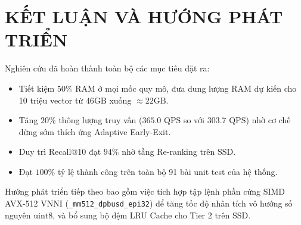 \documentclass[12pt,a4paper]{article}
\begin{document}
\section{KẾT LUẬN VÀ HƯỚNG PHÁT TRIỂN}
Nghiên cứu đã hoàn thành toàn bộ các mục tiêu đặt ra:
\begin{itemize}
  \item Tiết kiệm $50\%$ RAM ở mọi mốc quy mô, đưa dung lượng RAM dự kiến cho 10 triệu vector từ $46\text{GB}$ xuống $\approx 22\text{GB}$.
  \item Tăng $20\%$ thông lượng truy vấn ($365.0\text{ QPS}$ so với $303.7\text{ QPS}$) nhờ cơ chế dừng sớm thích ứng Adaptive Early-Exit.
  \item Duy trì Recall@10 đạt $94\%$ nhờ tầng Re-ranking trên SSD.
  \item Đạt $100\%$ tỷ lệ thành công trên toàn bộ 91 bài unit test của hệ thống.
\end{itemize}

Hướng phát triển tiếp theo bao gồm việc tích hợp tập lệnh phần cứng SIMD AVX-512 VNNI (\texttt{\_mm512\_dpbusd\_epi32}) để tăng tốc độ nhân tích vô hướng số nguyên $\text{uint8}$, và bổ sung bộ đệm LRU Cache cho Tier 2 trên SSD.
\end{document}
